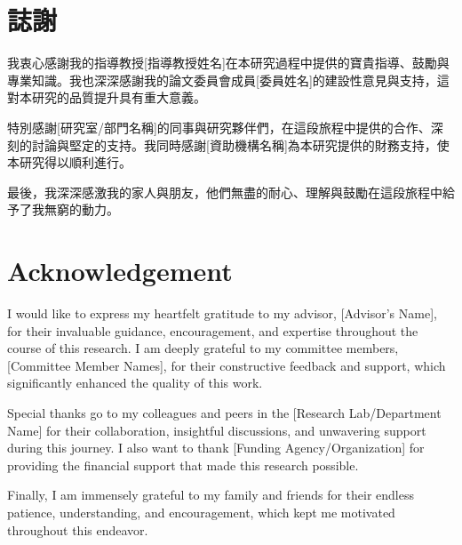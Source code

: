 \chapter*{\hfill 誌謝\hfill}
我衷心感謝我的指導教授[指導教授姓名]在本研究過程中提供的寶貴指導、鼓勵與專業知識。我也深深感謝我的論文委員會成員[委員姓名]的建設性意見與支持，這對本研究的品質提升具有重大意義。

特別感謝[研究室/部門名稱]的同事與研究夥伴們，在這段旅程中提供的合作、深刻的討論與堅定的支持。我同時感謝[資助機構名稱]為本研究提供的財務支持，使本研究得以順利進行。

最後，我深深感激我的家人與朋友，他們無盡的耐心、理解與鼓勵在這段旅程中給予了我無窮的動力。
\clearpage

\chapter*{\hfill Acknowledgement\hfill}
I would like to express my heartfelt gratitude to my advisor, [Advisor's Name], for their invaluable guidance, encouragement, and expertise throughout the course of this research. I am deeply grateful to my committee members, [Committee Member Names], for their constructive feedback and support, which significantly enhanced the quality of this work.

Special thanks go to my colleagues and peers in the [Research Lab/Department Name] for their collaboration, insightful discussions, and unwavering support during this journey. I also want to thank [Funding Agency/Organization] for providing the financial support that made this research possible.

Finally, I am immensely grateful to my family and friends for their endless patience, understanding, and encouragement, which kept me motivated throughout this endeavor.
\clearpage